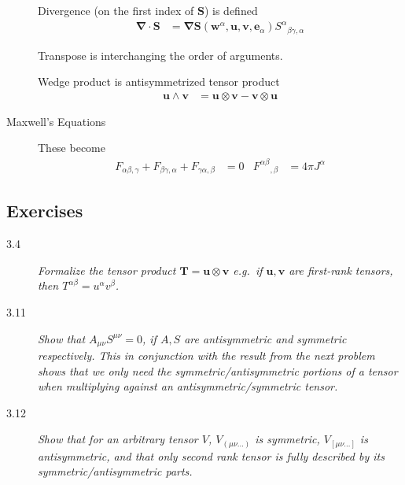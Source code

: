 \documentclass[12pt]{report}
\begin{document}
\begin{description}
        Divergence (on the first index of $\mathbf{S}$) is defined
        \begin{align}
            \mathbf{\nabla} \cdot \mathbf{S} &= \mathbf{\nabla} \mathbf{S}
                (\mathbf{w}^\alpha, \mathbf{u}, \mathbf{v}, \mathbf{e}_\alpha)
            {S^{\alpha}}_{\beta\gamma,\alpha}
        \end{align}

        Transpose is interchanging the order of arguments.

        Wedge product is antisymmetrized tensor product
        \begin{align}
            \mathbf{u} \wedge \mathbf{v} &= \mathbf{u} \otimes \mathbf{v} -
                \mathbf{v} \otimes \mathbf{u}
        \end{align}

    \item[Maxwell's Equations] These become
        \begin{align}
            F_{\alpha\beta,\gamma} + F_{\beta\gamma, \alpha} +
            F_{\gamma\alpha,\beta} &= 0 &
            {F^{\alpha\beta}}_{,\beta} &= 4\pi J^\alpha
        \end{align}
\end{description}

\subsection{Exercises}

\begin{description}
    \item[3.4] \emph{Formalize the tensor product $\mathbf{T} = \mathbf{u}
        \otimes \mathbf{v}$ e.g.\ if $\mathbf{u}, \mathbf{v}$ are first-rank
        tensors, then $T^{\alpha\beta} = u^\alpha v^\beta$.}

    \item[3.11] \emph{Show that $A_{\mu\nu}S^{\mu\nu} = 0$, if $A,S$ are
        antisymmetric and symmetric respectively. This in conjunction with the
        result from the next problem shows that we only need the
        symmetric/antisymmetric portions of a tensor when multiplying against an
        antisymmetric/symmetric tensor.}

    \item[3.12] \emph{Show that for an arbitrary tensor $V$, $V_{(\mu\nu\dots)}$
        is symmetric, $V_{[\mu\nu\dots]}$ is antisymmetric, and that only second
        rank tensor is fully described by its symmetric/antisymmetric parts.}
\end{description}
\end{document}
